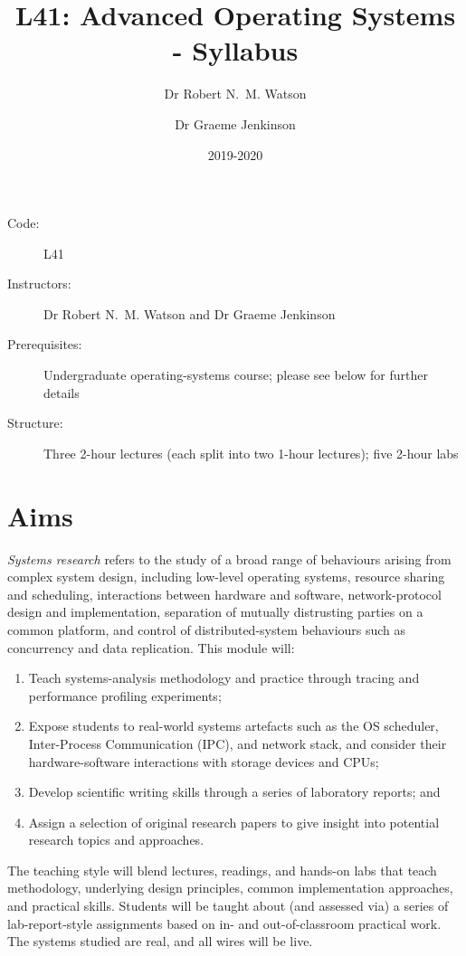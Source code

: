 \documentclass[a4paper,10pt]{article}
\begin{document}
\title{L41: Advanced Operating Systems - Syllabus}
\author{Dr Robert N.~M. Watson \and Dr Graeme Jenkinson}
\date{2019-2020}
\maketitle

\noindent
\begin{description}
\item[Code:] L41
\item[Instructors:] Dr Robert N.~M. Watson and Dr Graeme Jenkinson
\item[Prerequisites:] Undergraduate operating-systems course; please see below
  for further details
\item[Structure:] Three 2-hour lectures (each split into two 1-hour lectures);
  five 2-hour labs
\end{description}

\section{Aims}

\textit{Systems research} refers to the study of a broad range of behaviours
arising from complex system design, including low-level operating systems,
resource sharing and scheduling, interactions between hardware and software,
network-protocol design and implementation, separation of mutually distrusting
parties on a common platform, and control of distributed-system behaviours
such as concurrency and data replication.
This module will:

\begin{enumerate}
\item Teach systems-analysis methodology and practice through tracing and
  performance profiling experiments;
\item Expose students to real-world systems artefacts such as the
  OS scheduler, Inter-Process Communication (IPC), and network stack, and
  consider their hardware-software interactions with storage devices and CPUs;
\item Develop scientific writing skills through a series of laboratory
  reports; and
\item Assign a selection of original research papers to give insight into
  potential research topics and approaches.
\end{enumerate}

The teaching style will blend lectures, readings, and hands-on labs that teach
methodology, underlying design principles, common implementation approaches,
and practical skills.
Students will be taught about (and assessed via) a series of lab-report-style
assignments based on in- and out-of-classroom practical work.
The systems studied are real, and all wires will be live.
\end{document}
